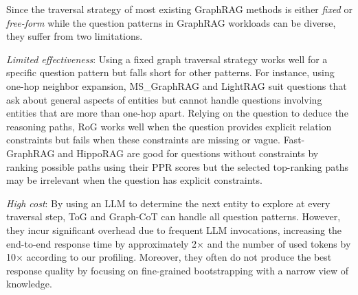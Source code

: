 Since the traversal strategy of most existing GraphRAG methods is either \textit{fixed} or \textit{free-form} while the question patterns in GraphRAG workloads can be diverse, they suffer from two limitations.


\squishlist
\item \textit{Limited effectiveness}: Using a fixed graph traversal strategy works well for a specific question pattern but falls short for other patterns. For instance, using one-hop neighbor expansion, MS\_GraphRAG and LightRAG suit questions that ask about general aspects of entities but cannot handle questions involving entities that are more than one-hop apart. Relying on the question to deduce the reasoning paths, RoG works well when the question provides explicit relation constraints but fails when these constraints are missing or vague. Fast-GraphRAG and HippoRAG are good for questions without constraints by ranking possible paths using their PPR scores but the selected top-ranking paths may be irrelevant when the question has explicit constraints.

\item \textit{High cost}: By using an LLM to determine the next entity to explore at every traversal step, ToG and Graph-CoT can handle all question patterns. However, they incur significant overhead due to frequent LLM invocations, increasing the end-to-end response time by approximately 2× and the number of used tokens by 10× according to our profiling. Moreover, they often do not produce the best response quality by focusing on fine-grained bootstrapping with a narrow view of knowledge.
\squishend



